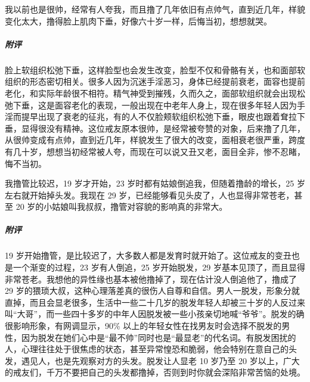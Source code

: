\begin{case}
    我以前也是很帅，经常有人夸我，而且撸了几年依旧有点帅气，直到近几年，样貌变化太大，撸得脸上肌肉下垂，好像六十岁一样，后悔当初，想想就哭。
    \subparagraph{附评} 脸上软组织松弛下垂，这样脸型也会发生改变，脸型不仅和骨骼有关，也和面部软组织的形态密切相关。很多人因为沉迷手淫恶习，身体已经提前衰老，面容也提前老化，和实际年龄很不相符。精气神受到摧残，久而久之，面部软组织就会出现松弛下垂，这是面容老化的表现，一般出现在中老年人身上，现在很多年轻人因为手淫而提早出现了衰老的征兆，有的人不仅脸颊软组织松弛下垂，眼皮也跟着耷拉下垂，显得很没有精神。这位戒友原本很帅，是经常被夸赞的对象，后来撸了几年，从很帅变成有点帅，直到近几年，样貌发生了很大的改变，面相衰老很严重，跨度有几十岁，想想当初经常被人夸，而现在可以说又丑又老，面目全非，惨不忍睹，悔不当初。
\end{case}

\begin{case}
    我撸管比较迟，19 岁才开始，23 岁时都有姑娘倒追我，但随着撸龄的增长，25 岁左右就开始掉头发。我现在 29 岁，已经能够看见头皮了，人也显得非常苍老，甚至 20 岁的小姑娘叫我叔叔，撸管对容貌的影响真的非常大。
    \subparagraph{附评} 19 岁开始撸管，是比较迟了，大多数人都是发育时就开始了。这位戒友的变丑也是一个渐变的过程，23 岁有人倒追，25 岁开始脱发，29 岁基本见顶了，而且显得非常苍老。我想他的异性缘也基本被他撸掉了，现在估计没人倒追他了，撸成了 29 岁的猥琐大叔，这种心理落差真的很伤人自尊和自信。男人一脱发，形象分就直掉，而且会显老很多，生活中一些二十几岁的脱发年轻人却被三十岁的人反过来叫“大哥”，而一些四十多岁的中年人因脱发被一些小孩亲切地喊“爷爷”。脱发的确很影响形象，有网调显示，90\% 以上的年轻女性在找男友时会选择不脱发的男性，因为脱发在她们心中是“最不帅”同时也是“最显老”的代名词。有脱发困扰的人，心理往往处于很焦虑的状态，甚至异常惶恐和脆弱，他会特别在意自己的头发，遇见人，也是先观察对方的头发。脱发让人显老 10 岁乃至 20 岁以上，广大的戒友们，千万不要把自己的头发都撸掉，否则到时你就会深陷非常苦恼的处境。
\end{case}

